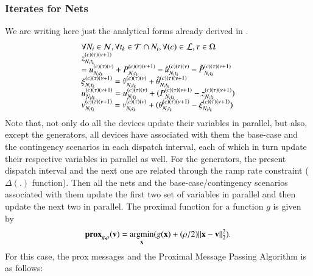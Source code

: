 \documentclass[preprint,12pt,3p]{elsarticle}
\begin{document}
	\subsubsection{Iterates for Nets}We are writing here just the analytical forms already derived in \cite{KC:13}. 
	\begin{equation}\label{ADMM_Nets_Lookahead_Demand}
	\begin{array}{ll}
	\forall N_i\in\mathcal{N},\forall t_k\in\mathcal{T}\cap N_i,\forall (c)\in\mathcal{L},\tau\in\Omega\notag\\
	z_{{N_i}{t_k}}^{(c)(\tau)(\nu+1)}\\=u_{{N_i}{t_k}}^{(c)(\tau)(\nu)}+P_{{N_i}{t_k}}^{(c)(\tau)(\nu+1)}-\hat{u}_{{N_i}{t_k}}^{(c)(\tau)(\nu)}-\hat{P}_{{N_i}{t_k}}^{(c)(\tau)(\nu+1)}\\
	\xi_{{N_i}{t_k}}^{(c)(\tau)(\nu+1)}=\hat{v}_{{N_i}{t_k}}^{(c)(\tau)(\nu)}+\hat{\theta}_{{N_i}{t_k}}^{(c)(\tau)(\nu+1)}\\
	u_{{N_i}{t_k}}^{(c)(\tau)(\nu+1)}=u_{{N_i}{t_k}}^{(c)(\tau)(\nu)}+(P_{{N_i}{t_k}}^{(c)(\tau)(\nu+1)}-z_{{N_i}{t_k}}^{(c)(\tau)(\nu+1)})\\
	v_{{N_i}{t_k}}^{(c)(\tau)(\nu+1)}=v_{{N_i}{t_k}}^{(c)(\tau)(\nu)}+(\theta_{{N_i}{t_k}}^{(c)(\tau)(\nu+1)}-\xi_{{N_i}{t_k}}^{(c)(\tau)(\nu+1)})
	\end{array}
	\end{equation}
	Note that, not only do all the devices update their variables in parallel, but also, except the generators, all devices have associated with them the base-case and the contingency scenarios in each dispatch interval, each of which in turn update their respective variables in parallel as well. For the generators, the present dispatch interval and the next one are related through the ramp rate constraint ($\Delta (.)$ function). Then all the nets and the base-case/contingency scenarios associated with them update the first two set of variables in parallel and then update the next two in parallel. The proximal function for a function $g$ is given by
	\[
	\mathbf{prox}_{g,\rho}({\mathbf{v}}) = \mathop{\rm argmin}_{\mathbf{x}} (g({\mathbf{x}}) + (\rho/2)\|{\mathbf{x}} - {\mathbf{v}}\|_2^2).
	\]
	For this case, the prox messages and the Proximal Message Passing Algorithm is as follows:
\end{document}
